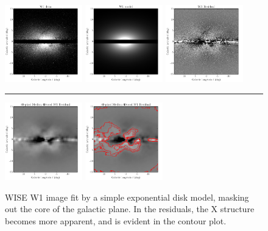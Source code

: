 \documentclass[12pt, preprint]{aastex}
\begin{document}
\begin{figure}
\centering
\includegraphics[width=0.3\textwidth]{xbulge-04}
\includegraphics[width=0.3\textwidth]{xbulge-08}
\includegraphics[width=0.3\textwidth]{xbulge-09}
\\
\rule{0.3\textwidth}{0pt}
\includegraphics[width=0.3\textwidth]{xbulge-10}
\includegraphics[width=0.3\textwidth]{xbulge-11}
\caption{WISE W1 image fit by a simple exponential disk model, masking
  out the core of the galactic plane.  In the residuals, the X
  structure becomes more apparent, and is evident in the contour plot.}
\label{fig:modfit}
\end{figure}
\end{document}
